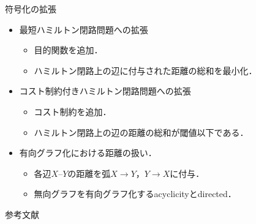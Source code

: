 \documentclass[dvipdfmx,10pt]{beamer}
\begin{document}
\begin{frame}[noframenumbering]{符号化の拡張}
  
  \begin{itemize}
  \item 最短ハミルトン閉路問題への拡張

    \begin{itemize}
    \item 目的関数を追加．
    \item ハミルトン閉路上の辺に付与された距離の総和を最小化．
    \end{itemize}
  \item コスト制約付きハミルトン閉路問題への拡張

    \begin{itemize}
    \item コスト制約を追加．
    \item ハミルトン閉路上の辺の距離の総和が閾値以下である．
    \end{itemize}
  \item 有向グラフ化における距離の扱い．

    \begin{itemize}
    \item 各辺$X–Y$の距離を弧$X \rightarrow Y$，$Y \rightarrow X$に付与．
    \item 無向グラフを有向グラフ化する\textsf{acyclicity}と\textsf{directed}．
    \end{itemize}
  \end{itemize}
\end{frame}

\begin{frame}[noframenumbering]{参考文献}
\end{frame}
\end{document}
